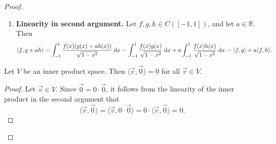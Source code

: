 \documentclass{homework}
\begin{document}
\begin{proof}
\begin{enumerate}
\begin{enumerate}
				\item \textbf{Linearity in second argument.} Let $f, g, h \in C([-1,1])$, and let $a \in \mathbb{R}$. Then
				\begin{equation*}
					\langle f, g+ah \rangle = \int_{-1}^1\frac{f(x)(g(x) + ah(x))}{\sqrt{1-x^2}}\;\text{d} x = \int_{-1}^1\frac{f(x)g(x)}{\sqrt{1-x^2}}\;\text{d} x + a\int_{-1}^1\frac{f(x)h(x)}{\sqrt{1-x^2}}\;\text{d} x = \langle f, g\rangle + a\langle f, h\rangle.
				\end{equation*}
			\end{enumerate}
		\end{enumerate}
		
		\question Let $V$ be an inner product space. Then $\langle \vec{v}, \vec{0} \rangle = 0$ for all $\vec{v} \in V$.
		\begin{proof}
			Let $\vec{v} \in V$. Since $\vec{0} = 0\cdot \vec{0}$, it follows from the linearity of the inner product in the second argument that
			\begin{equation*}
				\langle\vec{v},\vec{0}\rangle =\langle \vec{v}, 0\cdot\vec{0}\rangle =0\cdot\langle\vec{v},\vec{0}\rangle = 0.
			\end{equation*}
		\end{proof}
	\end{proof}
	
\end{document}
